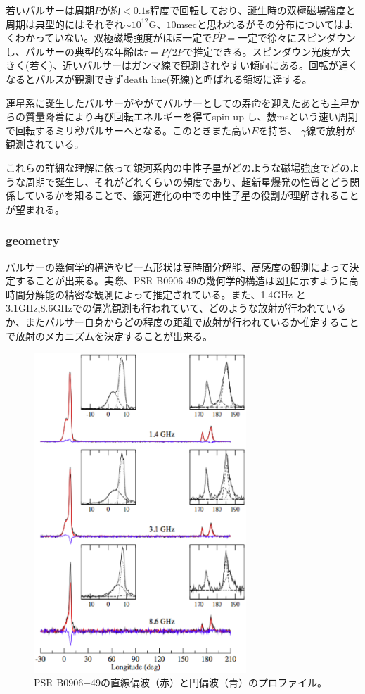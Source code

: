 若いパルサーは周期$P$が約$< 0.1$s程度で回転しており、誕生時の双極磁場強度と周期は典型的にはそれぞれ$\sim 10^{12}$G、$10$msecと思われるがその分布についてはよくわかっていない。双極磁場強度がほぼ一定で$P \dot{P}=$一定で徐々にスピンダウンし、パルサーの典型的な年齢は$\tau = P/2\dot{P}$で推定できる。スピンダウン光度が大きく(若く)、近いパルサーはガンマ線で観測されやすい傾向にある。回転が遅くなるとパルスが観測できずdeath line(死線)と呼ばれる領域に達する。

連星系に誕生したパルサーがやがてパルサーとしての寿命を迎えたあとも主星からの質量降着により再び回転エネルギーを得てspin up し、数msという速い周期で回転するミリ秒パルサーへとなる。このときまた高い$\dot{E}$を持ち、
$\gamma$線で放射が観測されている。

これらの詳細な理解に依って銀河系内の中性子星がどのような磁場強度でどのような周期で誕生し、それがどれくらいの頻度であり、超新星爆発の性質とどう関係しているかを知ることで、銀河進化の中での中性子星の役割が理解されることが望まれる。

\subsubsection{geometry}
パルサーの幾何学的構造やビーム形状は高時間分解能、高感度の観測によって決定することが出来る。実際、PSR B0906-49の幾何学的構造は図\ref{fig:pulsar-beam}に示すように高時間分解能の精密な観測によって推定されている\citep{Kramer08}。また、1.4GHz と3.1GHz,8.6GHzでの偏光観測も行われていて、どのような放射が行われているか、またパルサー自身からどの程度の距離で放射が行われているか推定することで放射のメカニズムを決定することが出来る。

\begin{figure}[t]
\begin{center}
\includegraphics[width=80mm]{pulsar/kumamoto.eps}
\end{center}
\vspace{-1cm}
\caption{PSR B0906−49の直線偏波（赤）と円偏波（青）のプロファイル\citep{Kramer08}。}
\label{fig:pulsar-beam}
\end{figure}

